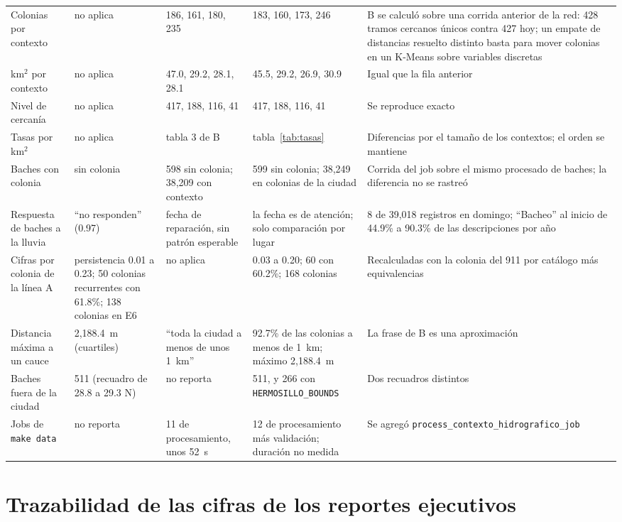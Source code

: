 \documentclass[11pt]{article}
\newcommand{\cod}[1]{\nolinkurl{#1}}
\begin{document}
\begin{longtable}{L{3.0cm} L{2.6cm} L{2.6cm} L{2.5cm} L{4.6cm}}
  Colonias por contexto & no aplica & 186, 161, 180, 235 & 183, 160, 173, 246 & B se calculó sobre una corrida anterior de la red: 428 tramos cercanos únicos contra 427 hoy; un empate de distancias resuelto distinto basta para mover colonias en un K-Means sobre variables discretas \\
  km$^2$ por contexto & no aplica & 47.0, 29.2, 28.1, 28.1 & 45.5, 29.2, 26.9, 30.9 & Igual que la fila anterior \\
  Nivel de cercanía & no aplica & 417, 188, 116, 41 & 417, 188, 116, 41 & Se reproduce exacto \\
  Tasas por km$^2$ & no aplica & tabla 3 de B & tabla~\ref{tab:tasas} & Diferencias por el tamaño de los contextos; el orden se mantiene \\
  Baches con colonia & sin colonia & 598 sin colonia; 38,209 con contexto & 599 sin colonia; 38,249 en colonias de la ciudad & Corrida del job sobre el mismo procesado de baches; la diferencia no se rastreó \\
  Respuesta de baches a la lluvia & ``no responden'' (0.97) & fecha de reparación, sin patrón esperable & la fecha es de atención; solo comparación por lugar & 8 de 39,018 registros en domingo; ``Bacheo'' al inicio de 44.9\% a 90.3\% de las descripciones por año \\
  Cifras por colonia de la línea A & persistencia 0.01 a 0.23; 50 colonias recurrentes con 61.8\%; 138 colonias en E6 & no aplica & 0.03 a 0.20; 60 con 60.2\%; 168 colonias & Recalculadas con la colonia del 911 por catálogo más equivalencias \\
  Distancia máxima a un cauce & 2,188.4~m (cuartiles) & ``toda la ciudad a menos de unos 1~km'' & 92.7\% de las colonias a menos de 1~km; máximo 2,188.4~m & La frase de B es una aproximación \\
  Baches fuera de la ciudad & 511 (recuadro de 28.8 a 29.3 N) & no reporta & 511, y 266 con \cod{HERMOSILLO_BOUNDS} & Dos recuadros distintos \\
  Jobs de \texttt{make data} & no reporta & 11 de procesamiento, unos 52~s & 12 de procesamiento más validación; duración no medida & Se agregó \cod{process_contexto_hidrografico_job} \\
\end{longtable}
\setlength{\tabcolsep}{6pt}
\normalsize

\section{Trazabilidad de las cifras de los reportes ejecutivos}
\label{sec:traza}
\end{document}
